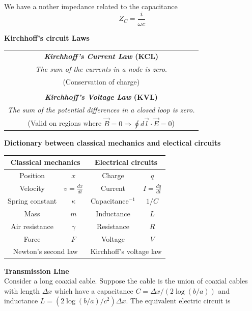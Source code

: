 \documentclass[12pt,a4paper]{article}
\begin{document}
We have a nother impedance related to the capacitance
\begin{equation}
	Z_C = \frac{i}{\omega c}
\end{equation}

\textbf{Kirchhoff's circuit Laws}\\
\begin{center}
\begin{tabular}{c} 
\textbf{\textit{Kirchhoff's Current Law} (KCL)} \\
\textit{The sum of the currents in a node is zero}. \\
(Conservation of charge) \\ 
 \\
\textbf{\textit{Kirchhoff's Voltage Law} (KVL)} \\
\textit{The sum of the potential differences in a closed loop is zero.}\\
(Valid on regions where $\vec{B} = 0 \Rightarrow\oint d\vec{l}\cdot \vec{E}=0$) \\ 
\end{tabular} 
\end{center}
\textbf{Dictionary between classical mechanics and electical circuits}
\begin{center}
\begin{tabular}{|cc|cc|}
\hline 
\multicolumn{2}{|c|}{\textbf{Classical mechanics}} & \multicolumn{2}{c|}{\textbf{Electrical circuits}} \\
\hline 
Position  & $x$ & Charge & $q$ \\ 
\hline 
Velocity & $v = \frac{dx}{dt}$ & Current & $I=\frac{dq}{dt}$ \\ 
\hline
Spring constant & $\kappa$ & Capacitance$^{-1}$ & $1/C$ \\ 
\hline 
Mass & $m$ & Inductance & $L$ \\ 
\hline
Air resistance & $\gamma$ & Resistance & $R$  \\ 
\hline
Force & $F$ & Voltage & $V$ \\ \hline 
\multicolumn{2}{|c}{Newton's second law} & \multicolumn{2}{|c|}{Kirchhoff's voltage law} \\ 
\hline
\end{tabular} 

\end{center}
\textbf{Transmission Line}\\
Consider a long coaxial cable. Suppose the cable is the union of coaxial cables with length $\Delta x$ which have a capacitance $C = \Delta x / (2\log(b/a))$ and inductance $L = (2\log(b/a)/c^2) \Delta x$. The equivalent electric circuit is
\end{document}
